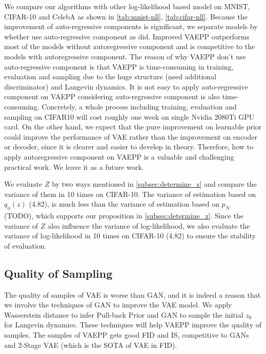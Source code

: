 We compare our algorithms with other log-likelihood based model on MNIST, CIFAR-10 and CelebA as shown in \cref{tab:mnist-nll}, \cref{tab:cifar-nll}. Because the improvement of auto-regressive components is significant, we separate models by whether use auto-regressive component as \cite{maaloe2019biva} did. Improved VAEPP outperforms most of the models without autoregressive component and is competitive to the models with autoregressive component. The reason of why VAEPP don't use auto-regressive component is that VAEPP is time-consuming in training,  evaluation and sampling due to the huge structure (need additional discriminator) and Langevin dynamics. It is not easy to apply auto-regressive component on VAEPP considering auto-regressive component is also time-consuming. Concretely, a whole process including training, evaluation and sampling on CIFAR10 will cost roughly one week on single Nvidia 2080Ti GPU card. On the other hand, we expect that the pure improvement on learnable prior could improve the performance of VAE rather than the improvement on encoder or decoder, since it is clearer and easier to develop in theory. Therefore, how to apply autoregressive component on VAEPP is a valuable and challenging practical work. We leave it as a future work.

We evaluate $Z$ by two ways mentioned in \cref{subsec:determine_z} and compare the variance of them in 10 times on CIFAR-10. The variance of estimation based on $q_\phi(z)$ (4.82), is much less than the variance of estimation based on $p_\mathcal{N}$ (TODO), which supports our proposition in \cref{subsec:determine_z}. Since the variance of $Z$ also influence the variance of log-likelihood, we also evaluate the variance of log-likelihood in 10 times on CIFAR-10 (4.82) to ensure the stability of evaluation. 

\subsection{Quality of Sampling}
The quality of samples of VAE is worse than GAN, and it is indeed a reason that we involve the techniques of GAN to improve the VAE model. We apply Wasserstein distance to infer Pull-back Prior and GAN to sample the initial $z_0$ for Langevin dynamics. These techniques will help VAEPP improve the quality of samples. The samples of VAEPP gets good FID and IS, competitive to GANs and 2-Stage VAE (which is the SOTA of VAE in FID). 

